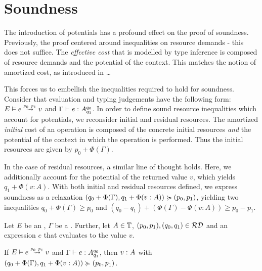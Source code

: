 \section{Soundness}\label{sec:soundness-6}

The introduction of potentials has a profound effect on the proof of soundness. Previously, the proof centered around inequalities on resource demands - this does not suffice. The \emph{effective cost} that is modelled by type inference is composed of resource demands and the potential of the context. This matches the notion of amortized cost, as introduced in \dots
{}

This forces us to embellish the inequalities required to hold for soundness. Consider that evaluation and typing judgements have the following form:  \(\evals{E}{e}{v}{p_0}{p_1}\) and \(\Gamma \vdash e : A ^{q_0}_{q_1}\). In order to define sound resource inequalities which account for potentials, we reconsider initial and residual resources. The amortized \emph{initial} cost of an operation is composed of the concrete initial resources \emph{and} the potential of the context in which the operation is performed. Thus the initial resources are given by \(p_0 + \Phi(\Gamma)\). 

In the case of residual resources, a similar line of thought holds. Here, we additionally account for the potential of the returned value \(v\), which yields \(q_1 + \Phi(v : A)\). With both initial and residual resources defined, we express soundness as a relaxation \((q_0 + \Phi(\Gamma), q_1 + \Phi(v : A)) \succcurlyeq (p_0, p_1)\), yielding two inequalities \(q_0 + \Phi(\Gamma) \geq p_0\) and \((q_0 - q_1) + (\Phi(\Gamma) - \Phi(v : A)) \geq p_0 - p_1\).



\begin{theorem}\label{thm:soundness-7}
   Let \(E\) be an , \(\Gamma\) be a . Further, let \(A \in \mathbb{T}\), \((p_0, p_1), (q_0, q_1) \in \mathcal{RD}\) and an expression \(e\) that evaluates to the value \(v\). 

   \begin{center}
   If \(\evals{E}{e}{v}{p_0}{p_1}\) and \(\Gamma \vdash e : A ^{q_0}_{q_1}\), then \(v : A ^{}_{}\) with \((q_0 + \Phi(\Gamma), q_1 + \Phi(v : A)) \succcurlyeq (p_0, p_1)\).
   \end{center}
\end{theorem}

